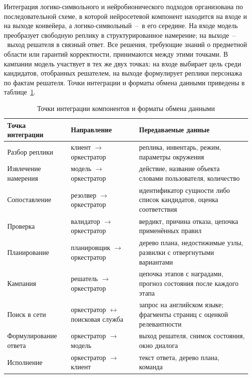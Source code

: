 Интеграция логико-символьного и нейробионического подходов организована по
последовательной схеме, в которой нейросетевой компонент находится на входе и на
выходе конвейера, а логико-символьный~--~в его середине. На входе модель преобразует
свободную реплику в структурированное намерение; на выходе~--~выход решателя в связный
ответ. Все решения, требующие знаний о предметной области или гарантий корректности,
принимаются между этими точками. В кампании модель участвует в тех же двух точках: на
входе выбирает цель среди кандидатов, отобранных решателем, на выходе формулирует
реплики персонажа по фактам решателя. Точки интеграции и форматы обмена данными
приведены в таблице~\ref{tab:integration}.

\begin{table}[!htb]
  \centering
  \caption{Точки интеграции компонентов и форматы обмена данными}
  \label{tab:integration}
  \begin{tabular}{|>{\raggedright\arraybackslash}p{}
                  |>{\raggedright\arraybackslash}p{}
                  |>{\raggedright\arraybackslash}p{}|}
    \hline
    Точка интеграции & Направление & Передаваемые данные \\
    \hline
    Разбор реплики & клиент $\to$\newline оркестратор & реплика, инвентарь, режим, параметры окружения \\
    \hline
    Извлечение намерения & модель $\to$\newline оркестратор & действие, название объекта словами пользователя, количество \\
    \hline
    Сопоставление & резолвер $\to$\newline оркестратор & идентификатор сущности либо список кандидатов, оценка соответствия \\
    \hline
    Проверка & валидатор $\to$\newline оркестратор & вердикт, причина отказа, цепочка применённых правил \\
    \hline
    Планирование & планировщик $\to$\newline оркестратор & дерево плана, недостижимые узлы, развилки с отвергнутыми вариантами \\
    \hline
    Кампания & решатель $\to$\newline оркестратор & цепочка этапов с наградами, прогноз состояния после каждого этапа \\
    \hline
    Поиск в сети & оркестратор $\leftrightarrow$\newline поисковая служба & запрос на английском языке; фрагменты страниц с оценкой релевантности \\
    \hline
    Формулирование ответа & оркестратор $\to$\newline модель & выход решателя, снимок состояния, окно диалога \\
    \hline
    Исполнение & оркестратор $\to$\newline клиент & текст ответа, дерево плана, команда \\
    \hline
  \end{tabular}
\end{table}

